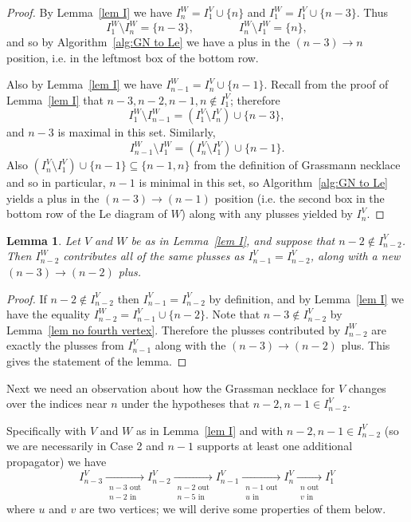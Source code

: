 \documentclass[11pt]{article}
\newtheorem{lem}[thm]{Lemma}
\theoremstyle{remark}
\theoremstyle{definition}
\begin{document}
\begin{proof}
By Lemma~\ref{lem I} we have $I_n^{W}= I_1^{V} \cup \{n\}$ and $I_1^{W} = I_1^{V} \cup \{n-3\}$. Thus 
\[I_1^{W} \setminus I_n^{W} = \{n-3\}, \qquad \qquad I_n^{W} \setminus I_1^{W} = \{n\},\]
and so by Algorithm~\ref{alg:GN to Le} we have a plus in the $(n-3) \rightarrow n$ position, i.e. in the leftmost box of the bottom row. 

Also by Lemma~\ref{lem I} we have $I_{n-1}^{W} = I_n^{V} \cup \{n-1\}$. Recall from the proof of Lemma~\ref{lem I} that $n-3,n-2,n-1,n \not\in I_1^V$; therefore
\[
I_1^W\setminus I_{n-1}^W = (I_1^V \setminus I_n^V) \cup\{n-3\},
\]
and $n-3$ is maximal in this set. Similarly, 
\[I_{n-1}^W \setminus I_1^W = (I_n^V \setminus I_1^V) \cup \{n-1\}.
\]
Also $(I_n^V \setminus I_1^V) \cup \{n-1\}\subseteq \{n-1,n\}$ from the definition of Grassmann necklace and so in particular, $n-1$ is minimal in this set, so Algorithm~\ref{alg:GN to Le} yields a plus in the $(n-3) \rightarrow (n-1)$ position (i.e. the second box in the bottom row of the Le diagram of $W$) along with any plusses yielded by $I_n^V$.
\end{proof} 



\begin{lem}\label{lem n-2 good}
  Let $V$ and $W$ be as in Lemma~\ref{lem I}, and suppose that $n-2 \not\in I_{n-2}^{V}$. Then $I_{n-2}^{W}$ contributes all of the same plusses as $I_{n-1}^{V}=I_{n-2}^{V}$, along with a new $(n-3)\rightarrow (n-2)$ plus.
\end{lem}

\begin{proof}
If $n-2\not\in I_{n-2}^{V}$ then $I_{n-1}^{V}=I_{n-2}^{V}$ by definition, and by Lemma~\ref{lem I} we have the equality ${I_{n-2}^{W} = I_{n-1}^{V} \cup \{n-2\}}$.  Note that $n-3\not\in I_{n-2}^{V}$ by Lemma~\ref{lem no fourth vertex}.  Therefore the plusses contributed by $I_{n-2}^{W}$ are exactly the  plusses from $I_{n-1}^{V}$ along with the $(n-3)\rightarrow (n-2)$ plus.  This gives the statement of the lemma.
\end{proof}

Next we need an observation about how the Grassman necklace for $V$ changes over the indices near $n$ under the hypotheses that $n-2, n-1\in I_{n-2}^V$.

Specifically with $V$ and $W$ as in Lemma~\ref{lem I} and with $n-2, n-1\in I_{n-2}^V$ (so we are necessarily in Case 2 and $n-1$ supports at least one additional propagator) we have
  \begin{equation}\label{eq necklace}
  I_{n-3}^{V} \xrightarrow[\substack{n-3\text{ out}\\n-2\text{ in}}]{} I_{n-2}^{V} \xrightarrow[\substack{n-2\text{ out}\\n-5\text{ in}}]{} I_{n-1}^{V} \xrightarrow[\substack{n-1\text{ out}\\ u \text{ in}}]{} I_{n}^{V}  \xrightarrow[\substack{n \text{ out}\\v \text{ in}}]{} I_1^{V}
  \end{equation}
where $u$ and $v$ are two vertices; we will derive some properties of them below.
\end{document}

